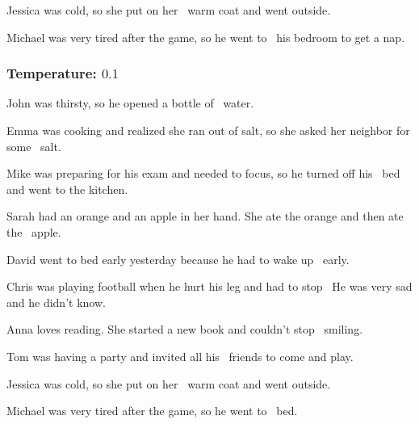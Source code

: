 \documentclass[11pt]{article}
\begin{document}
    Jessica was cold, so she put on her \textellipsis\ warm coat and went outside.

    Michael was very tired after the game, so he went to \textellipsis\ his bedroom to get a nap.

    \subsubsection*{Temperature: $0.1$}

    John was thirsty, so he opened a bottle of \textellipsis\ water.

    Emma was cooking and realized she ran out of salt, so she asked her neighbor for some \textellipsis\ salt.

    Mike was preparing for his exam and needed to focus, so he turned off his \textellipsis\ bed and went to the kitchen.

    Sarah had an orange and an apple in her hand. She ate the orange and then ate the \textellipsis\ apple.

    David went to bed early yesterday because he had to wake up \textellipsis\ early.

    Chris was playing football when he hurt his leg and had to stop \textellipsis\  He was very sad and he didn't know.

    Anna loves reading. She started a new book and couldn't stop \textellipsis\ smiling.

    Tom was having a party and invited all his \textellipsis\ friends to come and play.

    Jessica was cold, so she put on her \textellipsis\ warm coat and went outside.

    Michael was very tired after the game, so he went to \textellipsis\ bed.

    \newpage

    \printbibliography
\end{document}
